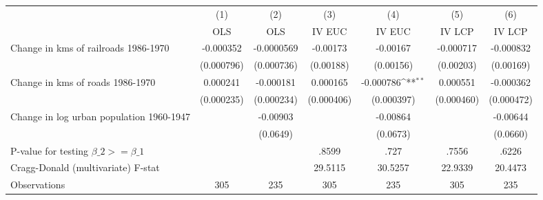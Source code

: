 {
\def\sym#1{\ifmmode^{#1}\else\(^{#1}\)\fi}
\begin{tabular}{l*{6}{c}}
\hline\hline
                &\multicolumn{1}{c}{(1)}&\multicolumn{1}{c}{(2)}&\multicolumn{1}{c}{(3)}&\multicolumn{1}{c}{(4)}&\multicolumn{1}{c}{(5)}&\multicolumn{1}{c}{(6)}\\
                &\multicolumn{1}{c}{OLS}&\multicolumn{1}{c}{OLS}&\multicolumn{1}{c}{IV EUC}&\multicolumn{1}{c}{IV EUC}&\multicolumn{1}{c}{IV LCP}&\multicolumn{1}{c}{IV LCP}\\
\hline
Change in kms of railroads 1986-1970&-0.000352         &-0.0000569         & -0.00173         & -0.00167         &-0.000717         &-0.000832         \\
                &(0.000796)         &(0.000736)         &(0.00188)         &(0.00156)         &(0.00203)         &(0.00169)         \\
[1em]
Change in kms of roads 1986-1970& 0.000241         &-0.000181         & 0.000165         &-0.000786\sym{**} & 0.000551         &-0.000362         \\
                &(0.000235)         &(0.000234)         &(0.000406)         &(0.000397)         &(0.000460)         &(0.000472)         \\
[1em]
Change in log urban population 1960-1947&                  & -0.00903         &                  & -0.00864         &                  & -0.00644         \\
                &                  & (0.0649)         &                  & (0.0673)         &                  & (0.0660)         \\
\hline
P-value for testing $\beta\_{2} >= \beta\_{1}$&                  &                  &    .8599         &     .727         &    .7556         &    .6226         \\
Cragg-Donald (multivariate) F-stat&                  &                  &  29.5115         &  30.5257         &  22.9339         &  20.4473         \\
Observations    &      305         &      235         &      305         &      235         &      305         &      235         \\
\hline\hline
\end{tabular}
}
